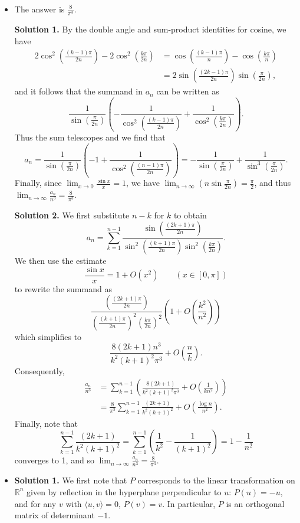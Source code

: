 \documentclass[amssymb,twocolumn,pra,10pt,aps]{revtex4-1}
\begin{document}
\begin{itemize}
\item[B2]
The answer is $\frac{8}{\pi^3}$.

\noindent
\textbf{Solution 1.}
By the double angle and sum-product identities for cosine, we have
\begin{align*}
2\cos^2\left(\frac{(k-1)\pi}{2n}\right) - 2\cos^2 \left(\frac{k\pi}{2n}\right) &= \cos\left(\frac{(k-1)\pi}{n}\right) - \cos\left(\frac{k\pi}{n}\right) \\
&= 2\sin\left(\frac{(2k-1)\pi}{2n}\right) \sin\left(\frac{\pi}{2n}\right),
\end{align*}
and it follows that the summand in $a_n$ can be written as
\[
\frac{1}{\sin\left(\frac{\pi}{2n}\right)} \left(-\frac{1}{\cos^2\left(\frac{(k-1)\pi}{2n}\right)}+\frac{1}{\cos^2\left(\frac{k\pi}{2n}\right)}\right).
\]
Thus the sum telescopes and we find that
\[
a_n = \frac{1}{\sin\left(\frac{\pi}{2n}\right)} \left(-1+\frac{1}{\cos^2\left(\frac{(n-1)\pi}{2n}\right)}\right) =
- \frac{1}{\sin\left(\frac{\pi}{2n}\right)}+ \frac{1}{\sin^3\left(\frac{\pi}{2n}\right)}.
\]
Finally, since $\lim_{x\to 0} \frac{\sin x}{x} = 1$, we have $\lim_{n\to\infty} \left( n\sin\frac{\pi}{2n} \right) = \frac{\pi}{2}$, and thus
$\lim_{n\to\infty} \frac{a_n}{n^3} = \frac{8}{\pi^3}$.

\noindent
\textbf{Solution 2.}
We first substitute $n-k$ for $k$ to obtain
\[
a_n=\sum_{k=1}^{n-1} \frac{\sin\left(\frac{(2k+1)\pi}{2n}\right)}{\sin^2\left(\frac{(k+1)\pi}{2n}\right)\sin^2\left(\frac{k\pi}{2n}\right)}.
\]
We then use the estimate
\[
\frac{\sin x}{x} = 1 + O(x^2) \qquad (x \in [0, \pi])
\]
to rewrite the summand as
\[
\frac{\left( \frac{(2k+1)\pi}{2n} \right)}{\left(\frac{(k+1)\pi}{2n}\right)^2 \left(\frac{k\pi}{2n}\right)^2} \left(1 + O\left( \frac{k^2}{n^2} \right) \right)
\]
which simplifies to
\[
\frac{8 (2k+1) n^3}{k^2 (k+1)^2 \pi^3} + O\left( \frac{n}{k} \right).
\]
Consequently,
\begin{align*}
\frac{a_n}{n^3} &= \sum_{k=1}^{n-1} \left( \frac{8 (2k+1)}{k^2 (k+1)^2 \pi^3} + O\left( \frac{1}{kn^2} \right) \right) \\
&= \frac{8}{\pi^3} \sum_{k=1}^{n-1} \frac{(2k+1)}{k^2 (k+1)^2} 
+ O \left( \frac{\log n}{n^2} \right). 
\end{align*}
Finally, note that
\[
\sum_{k=1}^{n-1} \frac{(2k+1)}{k^2 (k+1)^2} = 
\sum_{k=1}^{n-1} \left( \frac{1}{k^2} - \frac{1}{(k+1)^2}\right) = 1 - \frac{1}{n^2}
\]
converges to 1, and so $\lim_{n \to \infty} \frac{a_n}{n^3} = \frac{8}{\pi^3}$.

\item[B3]
\noindent
\textbf{Solution 1.}
We first note that $P$ corresponds to the linear transformation on $\mathbb{R}^n$ given by reflection in the hyperplane perpendicular to $u$: $P(u) = -u$, and for any $v$ with $\langle u,v\rangle = 0$, $P(v) = v$. In particular, $P$ is an orthogonal matrix of determinant $-1$.


\end{itemize}
\end{document}
